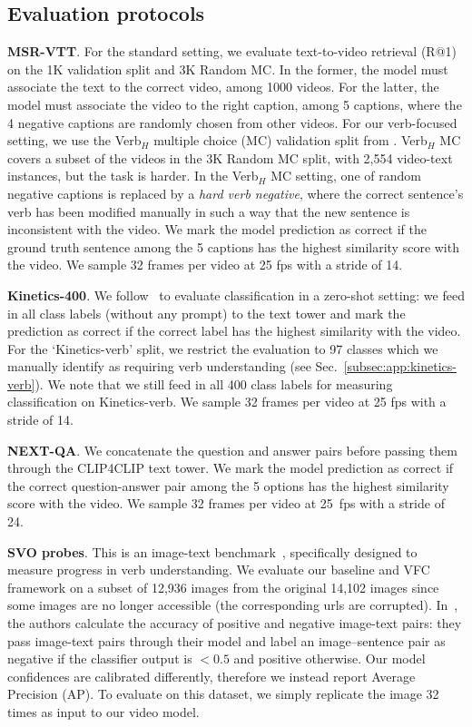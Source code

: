 \subsection{Evaluation protocols}\label{subsec:app:eval_proto}

\noindent \textbf{MSR-VTT}. For the standard setting, we evaluate text-to-video retrieval (R@1) on the 1K validation split and 3K Random MC. In the former, the model must associate the text to the correct video, among 1000 videos. For the latter, the model must associate the video to the right caption, among 5 captions, where the 4 negative captions are randomly chosen from other videos. For our verb-focused setting, we use the Verb$_{H}$ multiple choice (MC) validation split from \cite{park-etal-2022-exposing}. Verb$_{H}$ MC covers a subset of the videos in the 3K Random MC split, with 2,554 video-text instances, but the task is harder. In the Verb$_{H}$ MC setting, one of random negative captions is replaced by a \textit{hard verb negative}, where the correct sentence's verb has been modified manually in such a way that the new sentence is inconsistent with the video. We mark the model prediction as correct if the ground truth sentence among the 5 captions has the highest similarity score with the video. We sample 32 frames per video at 25 fps with a stride of 14.

\noindent \textbf{Kinetics-400}. We follow~\cite{Radford2021CLIP} to evaluate classification in a zero-shot setting: we feed in all class labels (without any prompt) to the text tower and mark the prediction as correct if the correct label has the highest similarity with the video. For the `Kinetics-verb' split, we restrict the evaluation to 97 classes which we manually identify as requiring verb understanding (see Sec.~\ref{subsec:app:kinetics-verb}). We note that we still feed in all 400 class labels for measuring classification on Kinetics-verb. We sample 32 frames per video at 25 fps with a stride of 14.

\noindent \textbf{NEXT-QA}. We concatenate the question and answer pairs before passing them through the CLIP4CLIP text tower. We mark the model prediction as correct if the correct question-answer pair among the 5 options has the highest similarity score with the video. We sample 32 frames per video at 25~fps with a stride of 24.

\noindent \textbf{SVO probes}. This is an image-text benchmark~\cite{hendricks2021probing}, specifically designed to measure progress in verb understanding. We evaluate our baseline and VFC framework on a subset of 12,936 images from the original 14,102 images since some images are no longer accessible (the corresponding urls are corrupted). In~\cite{hendricks2021probing}, the authors calculate the accuracy of positive and negative image-text pairs: they pass image-text pairs through their model and label an image–sentence pair as negative if the classifier output is $< 0.5$ and
positive otherwise. Our model confidences are calibrated differently, therefore we instead report Average Precision (AP). To evaluate on this dataset, we simply replicate the image 32 times as input to our video model.

